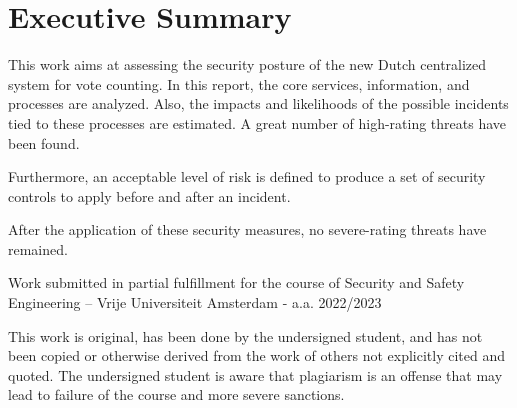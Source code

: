 \chapter*{Executive Summary} 
\label{sommario}


This work aims at assessing the security posture of the new Dutch centralized system for vote counting. In this report, the core services, information, and processes are analyzed. Also, the impacts and likelihoods of the possible incidents tied to these processes are estimated. A great number of high-rating threats have been found. 

Furthermore, an acceptable level of risk is defined to produce a set of security controls to apply before and after an incident.

After the application of these security measures, no severe-rating threats have remained.

\vspace{\fill} 

\noindent Work submitted in partial fulfillment for the course of Security and Safety Engineering – Vrije Universiteit Amsterdam - a.a. 2022/2023

This work is original, has been done by the undersigned student, and has not been copied or otherwise derived from the work of others not explicitly cited and quoted. The undersigned student is aware that plagiarism is an offense that may lead to failure of the course and more severe sanctions.
 
\newpage